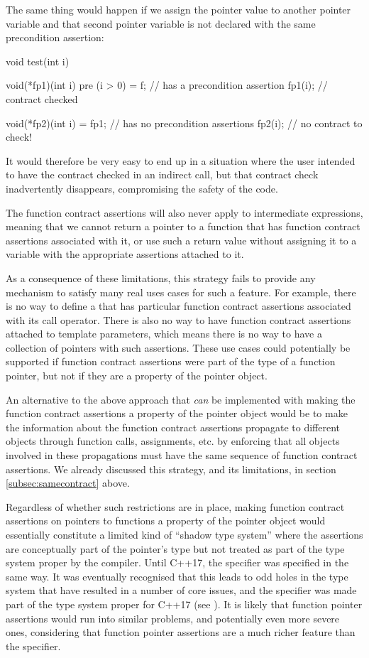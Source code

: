 The same thing would happen if we assign the pointer value to another pointer variable and that second pointer variable is not declared with the same precondition assertion:
\begin{codeblock}
void test(int i) {
  void(*fp1)(int i) pre (i > 0) = f;   //  has a precondition assertion
  fp1(i);   // contract  checked
  
  void(*fp2)(int i) = fp1;             //  has no precondition assertions
  fp2(i);  // no contract to check!
}
\end{codeblock}
It would therefore be very easy to end up in a situation where the user intended to have the contract checked in an indirect call, but that contract check inadvertently disappears, compromising the safety of the code.

The function contract assertions will also never apply to intermediate expressions, meaning that we cannot return a pointer to a function that has function contract assertions associated with it, or use such a return value without assigning it to a variable with the appropriate assertions attached to it.

As a consequence of these limitations, this strategy fails to provide any mechanism to satisfy many real uses cases for such a feature. For example, there is no way to define a  that has particular function contract assertions associated with its call operator. There is also no way to have function contract assertions attached to template parameters, which means there is no way to have a collection of pointers with such assertions. These use cases could potentially be supported if function contract assertions were part of the type of a function pointer, but not if they are a property of the pointer object.

An alternative to the above approach that \emph{can} be implemented with making the function contract assertions a property of the pointer object would be to make the information about the function contract assertions propagate to different objects through function calls, assignments, etc. by enforcing that all objects involved in these propagations must have the same sequence of function contract assertions. We already discussed this strategy, and its limitations, in section \ref{subsec:samecontract} above.

Regardless of whether such restrictions are in place, making function contract assertions on pointers to functions a property of the pointer object would essentially constitute a limited kind of ``shadow type system'' where the assertions are conceptually part of the pointer's type but not treated as part of the type system proper by the compiler. Until C++17, the  specifier was specified in the same way. It was eventually recognised that this leads to odd holes in the type system that have resulted in a number of core issues, and the  specifier was made part of the type system proper for C++17 (see \cite{P0012R1}). It is likely that function pointer assertions would run into similar problems, and potentially even more severe ones, considering that function pointer assertions are a much richer feature than the  specifier.

